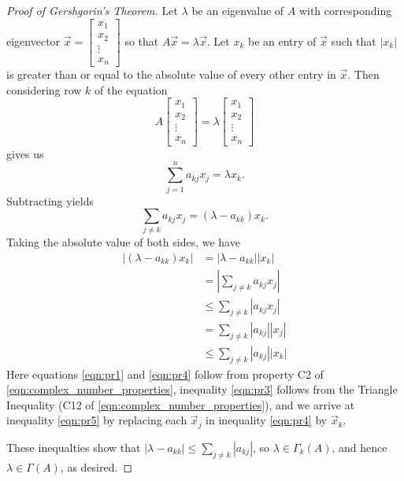 \documentclass{ximera}
\begin{document}
\begin{proof}[Proof of Gershgorin's Theorem]
Let $\lambda$ be an eigenvalue of $A$ with corresponding eigenvector $\vec{x}=\begin{bmatrix}
x_1 \\ x_2 \\ \vdots \\ x_n
\end{bmatrix}$ so that $A\vec{x}=\lambda\vec{x}$. Let $x_k$ be an entry of $\vec{x}$ such that $|x_k|$ is greater than or equal to the absolute value of every other entry in $\vec{x}$.  Then considering row $k$ of the equation $$A\begin{bmatrix}
x_1 \\ x_2 \\ \vdots \\ x_n
\end{bmatrix}=\lambda\begin{bmatrix}
x_1 \\ x_2 \\ \vdots \\ x_n
\end{bmatrix}$$ gives us 
$$\sum_{j=1}^n a_{kj} x_j = \lambda x_k.$$
Subtracting yields 
$$\sum_{j\ne k} a_{kj} x_j = (\lambda - a_{kk}) x_k.$$
Taking the absolute value of both sides, we have
\begin{align}
    |(\lambda - a_{kk})x_k| &= |\lambda - a_{kk}| |x_k|\label{eqn:pr1} \\ 
    &= \left|\sum_{j\ne k} a_{kj} x_j\right| \label{eqn:pr2} \\ 
    &\le \sum_{j\ne k} |a_{kj} x_j| \label{eqn:pr3} \\ 
    &= \sum_{j\ne k} |a_{kj}| |x_j| \label{eqn:pr4}\\ 
    &\le \sum_{j\ne k} |a_{kj}| |x_k| \label{eqn:pr5}
\end{align}
Here equations \ref{eqn:pr1} and \ref{eqn:pr4} follow from property C2 of \ref{eqn:complex_number_properties}, inequality \ref{eqn:pr3} follows from the Triangle Inequality (C12 of \ref{eqn:complex_number_properties}), and we arrive at inequality \ref{eqn:pr5} by replacing each $\vec{x}_j$ in inequality \ref{eqn:pr4} by $\vec{x}_k$.

These inequalties show that $|\lambda - a_{kk}| \le \sum_{j\ne k} |a_{kj}|$, so $\lambda \in \Gamma_k(A)$, and hence $\lambda \in \Gamma(A)$, as desired.

\end{proof}
\end{document}
